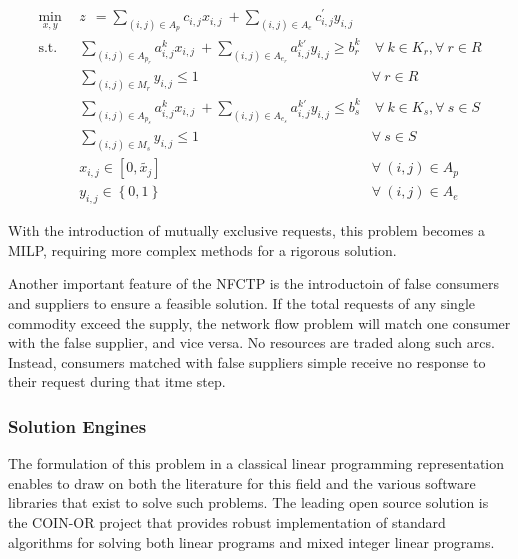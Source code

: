 \begin{subequations}\label{eqs:NFCTP}
  \begin{align}
    \min_{x, y} \:\: 
    & 
    z \:\: = 
    \sum_{(i, j) \in A_p} c_{i,j} x_{i,j} 
    \: + 
    \sum_{(i, j) \in A_e} c^{\prime}_{i,j} y_{i,j} 
    & 
    \label{eqs:NFCTP_obj} \\
    \text{s.t.} \:\:
    &
    \sum_{(i, j) \in A_{p_r}} a^k_{i,j} x_{i,j}
    \: + 
    \sum_{(i, j) \in A_{e_r}} a^{k\prime}_{i,j} y_{i,j}
    \geq b^k_r 
    &
    \: 
    \forall \: k \in K_r,  
    \forall \: r \in R 
    \label{eqs:NFCTP_req} \\
    &
    \sum_{(i, j) \in M_{r}} y_{i,j} \leq 1 
    &
    \forall \: r \in R 
    \label{eqs:NFCTP_mut_req} \\
    &
    \sum_{(i, j) \in A_{p_s}} a^k_{i,j} x_{i,j}
    \: + 
    \sum_{(i, j) \in A_{e_s}} a^{k\prime}_{i,j} y_{i,j}
    \leq b^k_s 
    &
    \: 
    \forall \: k \in K_s, 
    \forall \: s \in S 
    \label{eqs:NFCTP_sup} \\
    &
    \sum_{(i, j) \in M_{s}} y_{i,j} \leq 1 
    &
    \forall \: s \in S 
    \label{eqs:NFCTP_mut_sup} \\
    &
    x_{i,j} \in [0, \tilde{x_j}]
    &
    \forall \: (i, j) \in A_p
    \label{eqs:NFCTP_x} \\
    &
    y_{i,j} \in \left\{ 0, 1 \right\}
    &
    \forall \: (i, j) \in A_e
    \label{eqs:NFCTP_y}
  \end{align}
\end{subequations}

With the introduction of mutually exclusive requests, this problem becomes a
\gls{MILP}, requiring more complex methods for a rigorous solution.

Another important feature of the \gls{NFCTP} is the introductoin of false
consumers and suppliers to ensure a feasible solution.  If the total requests
of any single commodity exceed the supply, the network flow problem will match
one consumer with the false supplier, and vice versa.  No resources are traded
along such arcs.  Instead, consumers matched with false suppliers simple
receive no response to their request during that itme step.

\subsubsection{Solution Engines}

The formulation of this problem in a classical linear programming
representation enables \Cyclus{} to draw on both the literature for this field
and the various software libraries that exist to solve such problems.  The
leading open source solution is the \gls{COIN-OR} project  that
provides robust implementation of standard algorithms for solving both linear
programs and mixed integer linear programs.

